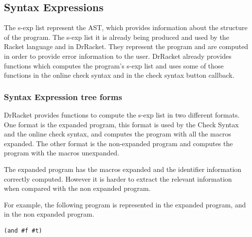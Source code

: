 
\subsection{Syntax Expressions}
The s-exp list represent the AST, which provides information about
the structure of the program.
The s-exp list it is already being produced and used by the Racket language and
in DrRacket.
They represent the program and are computed in order to provide error information
to the user.
DrRacket already provides functions which computes the program's s-exp list and uses some of those
functions in the online check syntax and in the check syntax button callback.



\subsubsection{Syntax Expression tree forms}
DrRacket provides functions to compute the s-exp list in two different formats.
One format is the expanded program, this format is used by the Check Syntax and
the online check syntax, and computes the program with all the macros expanded. %
The other format is the non-expanded program and computes the program with the macros
unexpanded.

The expanded program has the macros expanded and the identifier information correctly
computed.
However it is harder to extract the relevant information when compared with the
non expanded program.

For example, the following program is represented in the expanded program,
and in the non expanded program. %

\begin{lstlisting}[basicstyle=\ttfamily, caption="example"]
(and #f #t)
\end{lstlisting}

